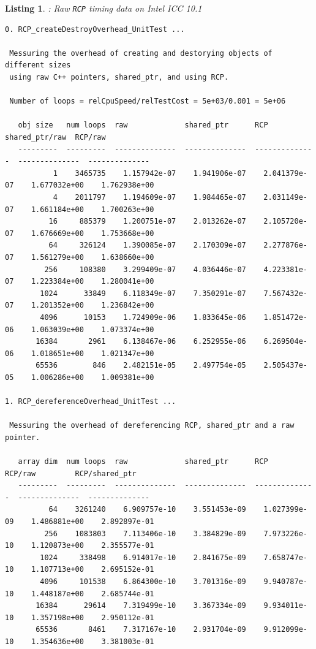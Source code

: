 \documentclass[pdf,ps2pdf,11pt]{SANDreport}
\newtheorem{listing}{Listing}
\begin{document}
\begin{listing}: Raw {}\texttt{RCP} timing data on Intel ICC 10.1  \\
\label{listing:RCP-ICC-Timings}
{\scriptsize\begin{verbatim}
0. RCP_createDestroyOverhead_UnitTest ... 
 
 Messuring the overhead of creating and destorying objects of different sizes
 using raw C++ pointers, shared_ptr, and using RCP.
 
 Number of loops = relCpuSpeed/relTestCost = 5e+03/0.001 = 5e+06
 
   obj size   num loops  raw             shared_ptr      RCP             shared_ptr/raw  RCP/raw       
   ---------  ---------  --------------  --------------  --------------  --------------  --------------
           1    3465735    1.157942e-07    1.941906e-07    2.041379e-07    1.677032e+00    1.762938e+00
           4    2011797    1.194609e-07    1.984465e-07    2.031149e-07    1.661184e+00    1.700263e+00
          16     885379    1.200751e-07    2.013262e-07    2.105720e-07    1.676669e+00    1.753668e+00
          64     326124    1.390085e-07    2.170309e-07    2.277876e-07    1.561279e+00    1.638660e+00
         256     108380    3.299409e-07    4.036446e-07    4.223381e-07    1.223384e+00    1.280041e+00
        1024      33849    6.118349e-07    7.350291e-07    7.567432e-07    1.201352e+00    1.236842e+00
        4096      10153    1.724909e-06    1.833645e-06    1.851472e-06    1.063039e+00    1.073374e+00
       16384       2961    6.138467e-06    6.252955e-06    6.269504e-06    1.018651e+00    1.021347e+00
       65536        846    2.482151e-05    2.497754e-05    2.505437e-05    1.006286e+00    1.009381e+00

1. RCP_dereferenceOverhead_UnitTest ... 
 
 Messuring the overhead of dereferencing RCP, shared_ptr and a raw pointer.
 
   array dim  num loops  raw             shared_ptr      RCP             RCP/raw         RCP/shared_ptr
   ---------  ---------  --------------  --------------  --------------  --------------  --------------
          64    3261240    6.909757e-10    3.551453e-09    1.027399e-09    1.486881e+00    2.892897e-01
         256    1083803    7.113406e-10    3.384829e-09    7.973226e-10    1.120873e+00    2.355577e-01
        1024     338498    6.914017e-10    2.841675e-09    7.658747e-10    1.107713e+00    2.695152e-01
        4096     101538    6.864300e-10    3.701316e-09    9.940787e-10    1.448187e+00    2.685744e-01
       16384      29614    7.319499e-10    3.367334e-09    9.934011e-10    1.357198e+00    2.950112e-01
       65536       8461    7.317167e-10    2.931704e-09    9.912099e-10    1.354636e+00    3.381003e-01


\end{verbatim}}
\end{listing}
\end{document}
